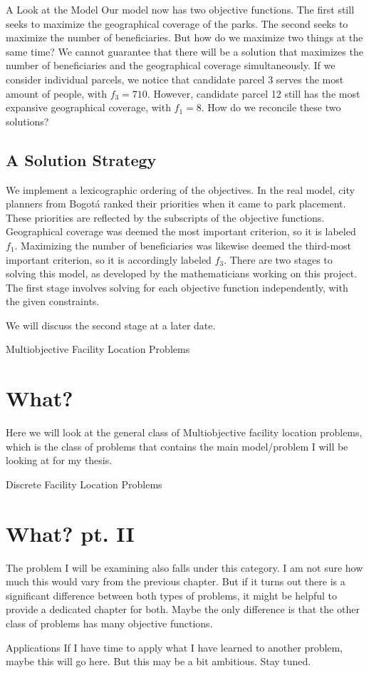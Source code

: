 \documentclass[12pt]{pom_thesis}
\begin{document}
\begin{chapter}{A Look at the Model}
	Our model now has two objective functions. The first still seeks to maximize the geographical coverage of the parks. The second seeks to maximize the number of beneficiaries. But how do we maximize two things at the same time? We cannot guarantee that there will be a solution that maximizes the number of beneficiaries and the geographical coverage simultaneously. If we consider individual parcels, we notice that candidate parcel 3 serves the most amount of people, with $f_3 = 710$. However, candidate parcel 12 still has the most expansive geographical coverage, with $f_1 = 8$. How do we reconcile these two solutions?

\subsection{A Solution Strategy}

	We implement a lexicographic ordering of the objectives. In the real model, city planners from Bogot\'{a} ranked their priorities when it came to park placement. These priorities are reflected by the subscripts of the objective functions. Geographical coverage was deemed the most important criterion, so it is labeled $f_1$. Maximizing the number of beneficiaries was likewise deemed the third-most important criterion, so it is accordingly labeled $f_3$. There are two stages to solving this model, as developed by the mathematicians working on this project. The first stage involves solving for each objective function independently, with the given constraints.
	
	We will discuss the second stage at a later date.
\end{chapter}

\begin{chapter}{Multiobjective Facility Location Problems}
\section{What?}
Here we will look at the general class of Multiobjective facility location problems, which is the class of problems that contains the main model/problem I will be looking at for my thesis. 
\end{chapter}

\begin{chapter}{Discrete Facility Location Problems}
\section{What? pt. II}
The problem I will be examining also falls under this category. I am not sure how much this would vary from the previous chapter. But if it turns out there is a significant difference between both types of problems, it might be helpful to provide a dedicated chapter for both. Maybe the only difference is that the other class of problems has many objective functions.
\end{chapter}

\begin{chapter}{Applications}
If I have time to apply what I have learned to another problem, maybe this will go here. But this may be a bit ambitious. Stay tuned.
\end{chapter}
\end{document}
